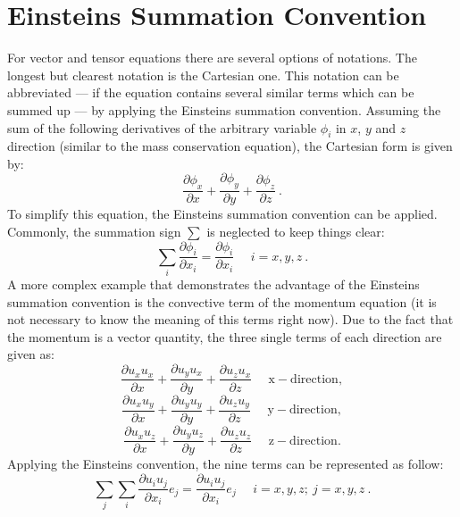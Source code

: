 \section{Einsteins Summation Convention}
%
%
	For vector and tensor equations there are several options of notations. The
    longest but clearest notation is the Cartesian one. This notation can be
    abbreviated --- if the equation contains several similar terms which can be
    summed up --- by applying the Einsteins summation convention. Assuming the
    sum of the following derivatives of the arbitrary variable $\phi_i$ in
    $x$, $y$ and $z$ direction (similar to the mass conservation equation),
    the Cartesian form is given by:
%
%
\begin{equation*}
 \frac{\partial \phi_x}{\partial x}
+\frac{\partial \phi_y}{\partial y}
+\frac{\partial \phi_z}{\partial z} ~.
\end{equation*}
%
%
	To simplify this equation, the Einsteins summation convention can be
    applied. Commonly, the summation sign $\sum$ is neglected to keep things
    clear:
%
%
\begin{equation}
  \sum_{i} \frac{\partial \phi_i}{\partial x_i}
=
  \frac{\partial \phi_i}{\partial x_i} ~~~~~~ i=x,y,z ~.
\end{equation}
%
%
    A more complex example that demonstrates the advantage of the Einsteins
    summation convention is the convective term of the momentum equation (it
    is not necessary to know the meaning of this terms right now). Due to the
    fact that the momentum is a vector quantity, the three single terms of each
    direction are given as:
%
%
\begin{equation*}
 \frac{\partial u_x u_x}{\partial x}
 +
 \frac{\partial u_y u_x}{\partial y}
 +
    \frac{\partial u_z u_x}{\partial z}~~~~~~ \mathrm{x-direction},
\end{equation*}
%
%
\begin{equation*}
 \frac{\partial u_x u_y}{\partial x}
 +
 \frac{\partial u_y u_y}{\partial y}
 +
    \frac{\partial u_z u_y}{\partial z}~~~~~~ \mathrm{y-direction},
\end{equation*}
%
%
\begin{equation*}
 \frac{\partial u_x u_z}{\partial x}
 +
 \frac{\partial u_y u_z}{\partial y}
 +
    \frac{\partial u_z u_z}{\partial z}~~~~~~ \mathrm{z-direction}.
\end{equation*}
%
%
	Applying the Einsteins convention, the nine terms can be represented as
    follow:
%
%
\begin{equation}
 \sum_j \sum_i \frac{\partial u_i u_j}{\partial x_i} e_j =  \frac{\partial u_i u_j}{\partial x_i} e_j ~~~~~~i=x,y,z; ~j=x,y,z~.
\end{equation}
